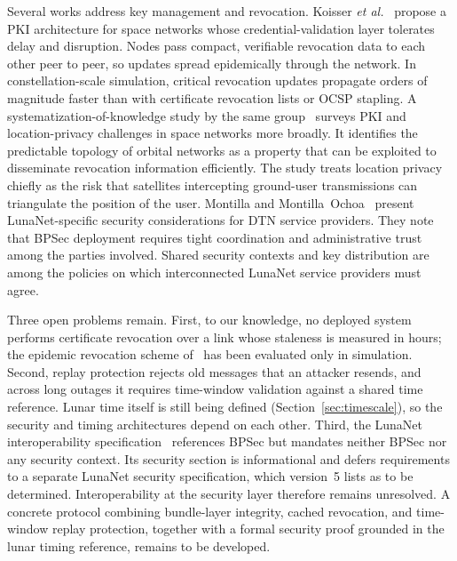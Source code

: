 \documentclass{IEEEoj}
\begin{document}
Several works address key management and revocation. Koisser \emph{et al.}~\cite{foerster_pki} propose a PKI architecture for space networks whose credential-validation layer tolerates delay and disruption. Nodes pass compact, verifiable revocation data to each other peer to peer, so updates spread epidemically through the network. In constellation-scale simulation, critical revocation updates propagate orders of magnitude faster than with certificate revocation lists or OCSP stapling. A systematization-of-knowledge study by the same group~\cite{koisser_pki_space} surveys PKI and location-privacy challenges in space networks more broadly. It identifies the predictable topology of orbital networks as a property that can be exploited to disseminate revocation information efficiently. The study treats location privacy chiefly as the risk that satellites intercepting ground-user transmissions can triangulate the position of the user. Montilla and Montilla~Ochoa~\cite{montilla_dtn_security} present LunaNet-specific security considerations for DTN service providers. They note that BPSec deployment requires tight coordination and administrative trust among the parties involved. Shared security contexts and key distribution are among the policies on which interconnected LunaNet service providers must agree.

Three open problems remain. First, to our knowledge, no deployed system performs certificate revocation over a link whose staleness is measured in hours; the epidemic revocation scheme of~\cite{foerster_pki} has been evaluated only in simulation. Second, replay protection rejects old messages that an attacker resends, and across long outages it requires time-window validation against a shared time reference. Lunar time itself is still being defined (Section~\ref{sec:timescale}), so the security and timing architectures depend on each other. Third, the LunaNet interoperability specification~\cite{lnis_v5} references BPSec but mandates neither BPSec nor any security context. Its security section is informational and defers requirements to a separate LunaNet security specification, which version~5 lists as to be determined. Interoperability at the security layer therefore remains unresolved. A concrete protocol combining bundle-layer integrity, cached revocation, and time-window replay protection, together with a formal security proof grounded in the lunar timing reference, remains to be developed.
\end{document}
